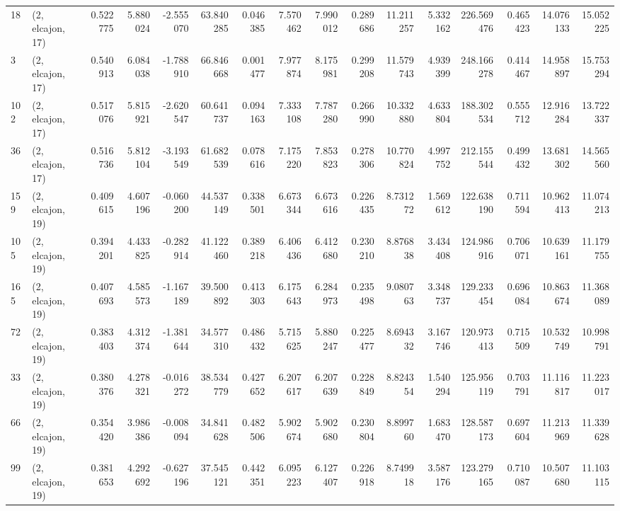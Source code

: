 \begin{tabular}{llrrrrrrrrrrrrrr}
18  &  (2, elcajon, 17) &   0.522775 &   5.880024 & -2.555070 &   63.840285 &  0.046385 &   7.570462 &   7.990012 &  0.289686 &  11.211257 &   5.332162 &  226.569476 &  0.465423 &  14.076133 &  15.052225 \\
3   &  (2, elcajon, 17) &   0.540913 &   6.084038 & -1.788910 &   66.846668 &  0.001477 &   7.977874 &   8.175981 &  0.299208 &  11.579743 &   4.939399 &  248.166278 &  0.414467 &  14.958897 &  15.753294 \\
102 &  (2, elcajon, 17) &   0.517076 &   5.815921 & -2.620547 &   60.641737 &  0.094163 &   7.333108 &   7.787280 &  0.266990 &  10.332880 &   4.633804 &  188.302534 &  0.555712 &  12.916284 &  13.722337 \\
36  &  (2, elcajon, 17) &   0.516736 &   5.812104 & -3.193549 &   61.682539 &  0.078616 &   7.175220 &   7.853823 &  0.278306 &  10.770824 &   4.997752 &  212.155544 &  0.499432 &  13.681302 &  14.565560 \\
159 &  (2, elcajon, 19) &   0.409615 &   4.607196 & -0.060200 &   44.537149 &  0.338501 &   6.673344 &   6.673616 &  0.226435 &   8.731272 &   1.569612 &  122.638190 &  0.711594 &  10.962413 &  11.074213 \\
105 &  (2, elcajon, 19) &   0.394201 &   4.433825 & -0.282914 &   41.122460 &  0.389218 &   6.406436 &   6.412680 &  0.230210 &   8.876838 &   3.434408 &  124.986916 &  0.706071 &  10.639161 &  11.179755 \\
165 &  (2, elcajon, 19) &   0.407693 &   4.585573 & -1.167189 &   39.500892 &  0.413303 &   6.175643 &   6.284973 &  0.235498 &   9.080763 &   3.348737 &  129.233454 &  0.696084 &  10.863674 &  11.368089 \\
72  &  (2, elcajon, 19) &   0.383403 &   4.312374 & -1.381644 &   34.577310 &  0.486432 &   5.715625 &   5.880247 &  0.225477 &   8.694332 &   3.167746 &  120.973413 &  0.715509 &  10.532749 &  10.998791 \\
33  &  (2, elcajon, 19) &   0.380376 &   4.278321 & -0.016272 &   38.534779 &  0.427652 &   6.207617 &   6.207639 &  0.228849 &   8.824354 &   1.540294 &  125.956119 &  0.703791 &  11.116817 &  11.223017 \\
66  &  (2, elcajon, 19) &   0.354420 &   3.986386 & -0.008094 &   34.841628 &  0.482506 &   5.902674 &   5.902680 &  0.230804 &   8.899760 &   1.683470 &  128.587173 &  0.697604 &  11.213969 &  11.339628 \\
99  &  (2, elcajon, 19) &   0.381653 &   4.292692 & -0.627196 &   37.545121 &  0.442351 &   6.095223 &   6.127407 &  0.226918 &   8.749918 &   3.587176 &  123.279165 &  0.710087 &  10.507680 &  11.103115 \\

\end{tabular}
